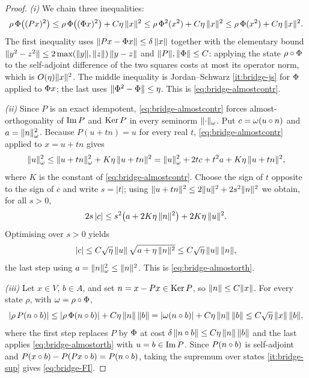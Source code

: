 \begin{proof}
\emph{(i)} We chain three inequalities:
\[
  \rho\,\Phi\big((Px)^2\big)
   \le\rho\,\Phi\big((\Phi x)^2\big)+C\eta\,\lVert x \rVert^2
   \le\rho\,\Phi^2(x^2)+C\eta\,\lVert x \rVert^2
   \le\rho\,\Phi(x^2)+C\eta\,\lVert x \rVert^2.
\]
The first inequality uses $\lVert Px-\Phi x \rVert\le\delta\,\lVert x \rVert$ together with
the elementary bound $\lVert y^2-z^2 \rVert\le2\max(\lVert y \rVert,\lVert z \rVert)\,\lVert y-z \rVert$ and
$\lVert P \rVert,\lVert \Phi \rVert\le C$: applying the state $\rho\circ\Phi$ to the
self-adjoint difference of the two squares costs at most its operator norm, which
is $O(\eta)\lVert x \rVert^2$. The middle inequality is Jordan--Schwarz \ref{it:bridge-js}
for $\Phi$ applied to $\Phi x$; the last uses
$\lVert \Phi^2-\Phi \rVert\le\eta$. This is \eqref{eq:bridge-almostcontr}.

\emph{(ii)} Since $P$ is an exact idempotent, \eqref{eq:bridge-almostcontr}
forces almost-orthogonality of $\operatorname{Im} P$ and $\operatorname{Ker} P$ in every seminorm
$\lVert \cdot \rVert_\omega$. Put $c=\omega(u\circ n)$ and $a=\lVert n \rVert_\omega^2$. Because
$P(u+tn)=u$ for every real $t$, \eqref{eq:bridge-almostcontr} applied to
$x=u+tn$ gives
\[
  \lVert u \rVert_\omega^2
   \le\lVert u+tn \rVert_\omega^2+K\eta\,\lVert u+tn \rVert^2
   =\lVert u \rVert_\omega^2+2tc+t^2a+K\eta\,\lVert u+tn \rVert^2,
\]
where $K$ is the constant of \eqref{eq:bridge-almostcontr}. Choose the sign of
$t$ opposite to the sign of $c$ and write $s=\lvert t\rvert$; using
$\lVert u+tn \rVert^2\le2\lVert u \rVert^2+2s^2\lVert n \rVert^2$ we obtain, for all $s>0$,
\[
  2s\,\lvert c\rvert\le s^2\big(a+2K\eta\,\lVert n \rVert^2\big)+2K\eta\,\lVert u \rVert^2 .
\]
Optimising over $s>0$ yields
\[
  \lvert c\rvert\le C\sqrt\eta\,\lVert u \rVert\,\sqrt{a+\eta\,\lVert n \rVert^2}
   \le C\sqrt\eta\,\lVert u \rVert\,\lVert n \rVert,
\]
the last step using $a=\lVert n \rVert_\omega^2\le\lVert n \rVert^2$. This is
\eqref{eq:bridge-almostorth}.

\emph{(iii)} Let $x\in V$, $b\in A$, and set $n=x-Px\in\operatorname{Ker} P$, so
$\lVert n \rVert\le C\lVert x \rVert$. For every state $\rho$, with $\omega=\rho\circ\Phi$,
\[
  \lvert\rho\,P(n\circ b)\rvert
   \le\lvert\rho\,\Phi(n\circ b)\rvert+C\eta\,\lVert n \rVert\,\lVert b \rVert
   =\lvert\omega(n\circ b)\rvert+C\eta\,\lVert n \rVert\,\lVert b \rVert
   \le C\sqrt\eta\,\lVert x \rVert\,\lVert b \rVert,
\]
where the first step replaces $P$ by $\Phi$ at cost
$\delta\,\lVert n\circ b \rVert\le C\eta\,\lVert n \rVert\,\lVert b \rVert$ and the last applies
\eqref{eq:bridge-almostorth} with $u=b\in\operatorname{Im} P$. Since $P(n\circ b)$ is
self-adjoint and $P(x\circ b)-P(Px\circ b)=P(n\circ b)$, taking the supremum over
states \ref{it:bridge-sup} gives \eqref{eq:bridge-FI}.
\end{proof}

